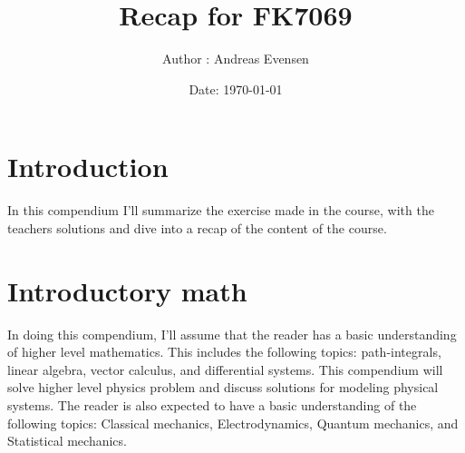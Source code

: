 \documentclass[a4paper]{article}
\title{Recap for FK7069}
\author{Author : Andreas Evensen}
\date{Date: \today}
\begin{document}
\maketitle
\section{Introduction}
In this compendium I'll summarize the exercise made in the course, with the teachers solutions and dive into a recap of the content of the course.


\section{Introductory math}
In doing this compendium, I'll assume that the reader has a basic understanding of higher level mathematics. This includes the following topics: path-integrals, linear algebra, vector calculus, and differential systems.
This compendium will solve higher level physics problem and discuss solutions for modeling physical systems. The reader is also expected to have a basic understanding of the following topics: Classical mechanics, Electrodynamics, Quantum mechanics, and Statistical mechanics.
\end{document}
